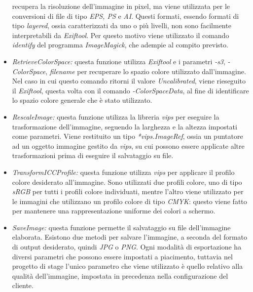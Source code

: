 \begin{itemize}
            recupera la risoluzione dell'immagine in pixel, ma viene utilizzata per le
            conversioni di file di tipo \emph{EPS, PS} e \emph{AI}. Questi formati,
            essendo formati di tipo \emph{layered}, ossia caratterizzati da uno o più
            livelli, non sono facilmente interpretabili da \emph{Exiftool}. Per questo
            motivo viene utilizzato il comando \emph{identify} del programma
            \emph{ImageMagick}, che adempie al compito previsto.
      \item \emph{RetrieveColorSpace:} questa funzione utilizza \emph{Exiftool} e
            i parametri \emph{-s3}, \emph{-ColorSpace}, \emph{filename} per recuperare
            lo spazio colore utilizzato dall'immagine. Nel caso in cui questo comando
            ritorni il valore \emph{Uncalibrated}, viene rieseguito il \emph{Exiftool},
            questa volta con il comando \emph{-ColorSpaceData}, al fine di identificare
            lo spazio colore generale che è stato utilizzato.
      \item \emph{RescaleImage:} questa funzione utilizza la libreria \emph{vips}
            per eseguire la trasformazione dell'immagine, seguendo la larghezza e la
            altezza impostati come parametri. Viene restituito un tipo
            \emph{*vips.ImageRef}, ossia un puntatore ad un oggetto immagine gestito da
            \emph{vips}, su cui possono essere applicate altre trasformazioni prima di
            eseguire il salvataggio su file.
      \item \emph{TransformICCProfile:} questa funzione utilizza \emph{vips} per
            applicare il profilo colore desiderato all'immagine. Sono utilizzati due
            profili colore, uno di tipo \emph{sRGB} per tutti i profili colore
            individuati, mentre l'altro viene utilizzato per le immagini che utilizzano
            un profilo colore di tipo \emph{CMYK}: questo viene fatto per mantenere una
            rappresentazione uniforme dei colori a schermo.
      \item \emph{SaveImage:} questa funzione permette il salvataggio su file
            dell'immagine elaborata. Esistono due metodi per salvare l'immagine, a
            seconda del formato di output desiderato, quindi \emph{JPG} o \emph{PNG}.
            Ogni modalità di esportazione ha diversi parametri che possono essere
            impostati a piacimento, tuttavia nel progetto di stage l'unico parametro che viene
            utilizzato è quello relativo alla qualità dell'immagine, impostata in
            precedenza nella configurazione del cliente.

\end{itemize}
